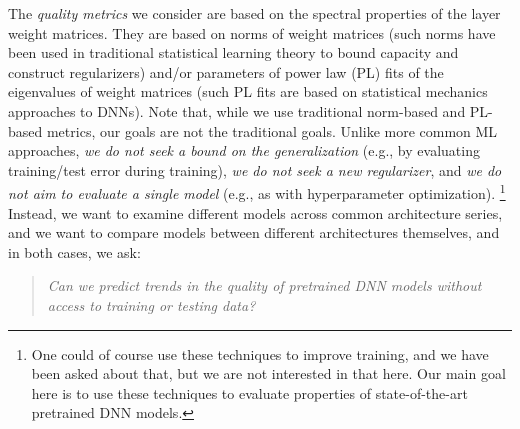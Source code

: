 The \emph{quality metrics} we consider are based on the spectral properties of the layer weight matrices.
They are based on norms of weight matrices (such norms have been used in traditional statistical learning theory to bound capacity and construct regularizers) and/or parameters of power law (PL) fits of the eigenvalues of weight matrices (such PL fits are based on statistical mechanics approaches to DNNs).
Note that, while we use traditional norm-based and PL-based metrics, our goals are not the traditional goals.
Unlike more common ML approaches, \emph{we do not seek a bound on the generalization} (e.g., by evaluating training/test error during training), \emph{we do not seek a new regularizer}, and \emph{we do not aim to evaluate a single model} (e.g., as with hyperparameter optimization).%
\footnote{One could of course use these techniques to improve training, and we have been asked about that, but we are not interested in that here. Our main goal here is to use these techniques to evaluate properties of state-of-the-art pretrained DNN models.}
Instead, we want to examine different models across common architecture series, and we want to compare models between different architectures themselves, and in both cases, we ask:
\begin{quote}
\emph{Can we predict trends in the quality of pretrained DNN models without access to training or testing data?}  
\end{quote}



